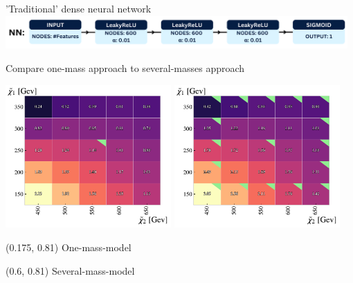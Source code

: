 \documentclass[UKenglish]{beamer}
\begin{document}
\begin{frame}{'Traditional' dense neural network}
    \vfill
    \centering
    \includegraphics[width = 0.98\textwidth]{figures/NN.png}
\end{frame}
\begin{frame}{Compare one-mass approach to several-masses approach}
    \vfill
    \begin{center}
        \includegraphics[width = 0.475\textwidth]{figures/grids/NN_OneMass_InterpolationGridSig.pdf}
        \includegraphics[width = 0.475\textwidth]{figures/grids/NN_InterpolationGridSig.pdf}
    \end{center}
    \begin{textblock}{0.8}(0.175, 0.81)
        One-mass-model
    \end{textblock}
    \begin{textblock}{0.8}(0.6, 0.81)
        Several-mass-model
    \end{textblock}
\end{frame}
\end{document}
